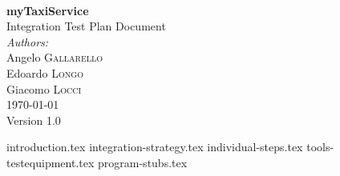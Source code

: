 \documentclass[12pt, a4paper]{article}
\begin{document}
\begin{titlepage}
 


\HRule \\[0.4cm]
{ \huge \bfseries myTaxiService} \\[0.2cm]%
	{\Large Integration Test Plan Document}
\HRule \\[1.5cm]
 


\large \emph{Authors:}\\
Angelo  \textsc{Gallarello}\\
Edoardo  \textsc{Longo}\\
Giacomo  \textsc{Locci}\\[1.5cm]


{\large \today \\Version 1.0} %



\vfill %

\end{titlepage}

\newpage

\tableofcontents

\newpage

{introduction.tex}
\newpage
{integration-strategy.tex}
\newpage
{individual-steps.tex}
\newpage
{tools-testequipment.tex}
\newpage
{program-stubs.tex}
\end{document}

